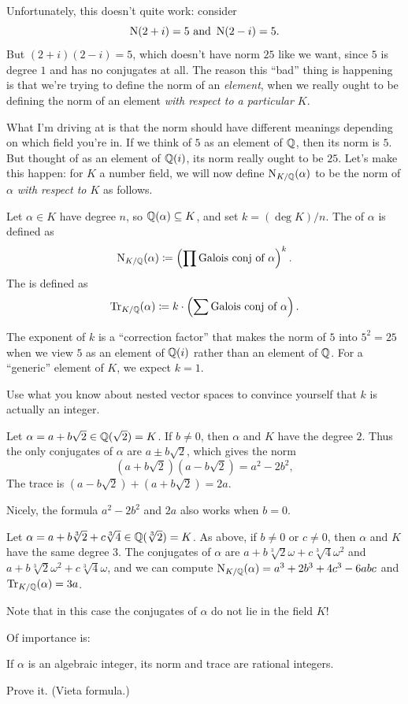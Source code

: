 Unfortunately, this doesn't quite work: consider
\[ \operatorname{N}(2+i) = 5 \text{ and } \operatorname{N}(2-i) = 5. \]
But $(2+i)(2-i) = 5$, which doesn't have norm $25$ like we want,
since $5$ is degree $1$ and has no conjugates at all.
The reason this ``bad'' thing is happening is that we're
trying to define the norm of an \emph{element},
when we really ought to be defining the norm of an element
\emph{with respect to a particular $K$}.

What I'm driving at is that the norm should have
different meanings depending on which field you're in.
If we think of $5$ as an element of $\mathbb Q$, then its norm is $5$.
But thought of as an element of $\mathbb Q(i)$, its norm really ought to be $25$.
Let's make this happen: for $K$ a number field, we will now define $\operatorname{N}_{K/\mathbb Q}(\alpha)$
to be the norm of $\alpha$ \emph{with respect to $K$} as follows.
\begin{definition}
	Let $\alpha \in K$ have degree $n$, so $\mathbb Q(\alpha) \subseteq K$, and set $k = (\deg K) / n$.
	The  of $\alpha$ is defined as
	\[ \operatorname{N}_{K/\mathbb Q}(\alpha) \coloneqq \left( \prod \text{Galois conj of $\alpha$} \right)^k. \]
	The  is defined as
	\[ \operatorname{Tr}_{K/\mathbb Q}(\alpha) \coloneqq k \cdot \left( \sum \text{Galois conj of $\alpha$} \right). \]
\end{definition}
The exponent of $k$ is a ``correction factor'' that makes the norm of $5$ into $5^2=25$
when we view $5$ as an element of $\mathbb Q(i)$ rather than an element of $\mathbb Q$.
For a ``generic'' element of $K$, we expect $k = 1$.
\begin{exercise}
	Use what you know about nested vector spaces to convince
	yourself that $k$ is actually an integer.
\end{exercise}
\begin{example}
	Let $\alpha = a+b\sqrt2 \in \mathbb Q(\sqrt2) = K$.
	If $b \neq 0$, then $\alpha$ and $K$ have the degree $2$.
	Thus the only conjugates of $\alpha$ are $a \pm b\sqrt2$, which gives
	the norm \[ (a+b\sqrt2)(a-b\sqrt2) = a^2-2b^2, \]
	The trace is $(a-b\sqrt2) + (a+b\sqrt2) = 2a$.

	Nicely, the formula $a^2-2b^2$ and $2a$ also works when $b=0$.
\end{example}
\begin{example}
	Let $\alpha = a+b\sqrt[3] 2+c\sqrt[3] 4 \in \mathbb Q(\sqrt[3]{2}) = K$.
	As above, if $b \neq 0$ or $c \neq 0$, then $\alpha$ and $K$ have the
	same degree $3$.
	The conjugates of $\alpha$ are $a+b\sqrt[3] 2 \omega+c\sqrt[3] 4 \omega^2$
	and $a+b\sqrt[3] 2 \omega^2+c\sqrt[3] 4 \omega$,
	and we can compute $\operatorname{N}_{K/\mathbb Q}(\alpha) = a^3 + 2b^3 + 4c^3 - 6abc$ and
	$\operatorname{Tr}_{K/\mathbb Q}(\alpha) = 3a$.

	Note that in this case the conjugates of $\alpha$ do not
	lie in the field $K$!
\end{example}
Of importance is:
\begin{proposition}
	If $\alpha$ is an algebraic integer, its norm and trace
	are rational integers.
\end{proposition}
\begin{ques}
	Prove it. (Vieta formula.)
\end{ques}

